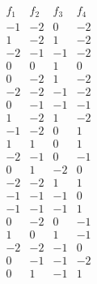 $$\begin{array}{rrrr} 
f_1 & f_2 & f_3 & f_4 \\ 
\hline 
-1 & -2 &  0 & -2 \\ 
 1 & -2 &  1 & -2 \\ 
-2 & -1 & -1 & -2 \\ 
 0 &  0 &  1 &  0 \\ 
 0 & -2 &  1 & -2 \\ 
-2 & -2 & -1 & -2 \\ 
 0 & -1 & -1 & -1 \\ 
 1 & -2 &  1 & -2 \\ 
-1 & -2 &  0 &  1 \\ 
 1 &  1 &  0 &  1 \\ 
-2 & -1 &  0 & -1 \\ 
 0 &  1 & -2 &  0 \\ 
-2 & -2 &  1 &  1 \\ 
-1 & -1 & -1 &  0 \\ 
-1 & -1 & -1 &  1 \\ 
 0 & -2 &  0 & -1 \\ 
 1 &  0 &  1 & -1 \\ 
-2 & -2 & -1 &  0 \\ 
 0 & -1 & -1 & -2 \\ 
 0 &  1 & -1 &  1 \\ 
\end{array}$$ 
